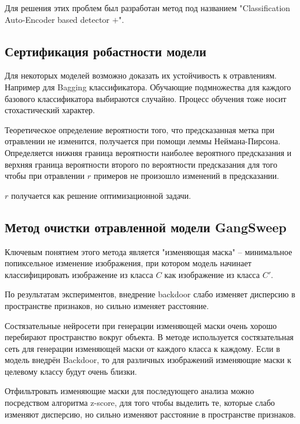 Для решения этих проблем был разработан метод под названием
"Classification Auto-Encoder based detector $+$".


\subsection*{Сертификация робастности модели}

Для некоторых моделей возможно доказать их устойчивость к отравлениям. Например для Bagging классификатора.
Обучающие подмножества для каждого базового классификатора выбираются случайно. Процесс обучения тоже носит стохастический характер.

Теоретическое определение вероятности того, что предсказанная метка при отравлении не изменится, получается при помощи леммы Неймана-Пирсона.
Определяется нижняя граница вероятности наиболее вероятного
предсказания и верхняя граница вероятности второго по вероятности предсказания для того чтобы при отравлении $r$ примеров не произошло изменений в предсказании.

$r$ получается как решение оптимизационной задачи.



\subsection*{Метод очистки отравленной модели GangSweep}
Ключевым понятием этого метода является "изменяющая маска" – минимальное попиксельное изменение изображения, при котором модель начинает классифицировать изображение из класса $C$ как изображение из класса $C'$.

По результатам экспериментов, внедрение backdoor слабо изменяет дисперсию в пространстве признаков, но сильно изменяет расстояние.

Состязательные нейросети при генерации изменяющей маски очень хорошо перебирают
пространство вокруг объекта. В методе используется состязательная сеть
для генерации изменяющей маски от каждого класса к каждому.
Если в модель внедрён Backdoor, то для различных изображений изменяющие маски к целевому классу будут очень близки.

Отфильтровать изменяющие маски для последующего анализа можно посредством алгоритма z-score, для того чтобы выделить те, которые слабо изменяют дисперсию, но сильно изменяют расстояние в пространстве признаков.

